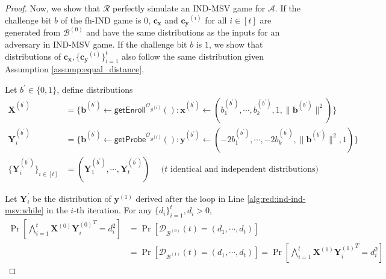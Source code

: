 \begin{proof}
Now, we show that $\mathcal{R}$ perfectly simulate an \textsf{IND-MSV} game for $\mathcal{A}$. If the challenge bit $b$ of the \textsf{fh-IND} game is $0$, $\mathbf{c_x}$ and $\mathbf{c_y}^{(i)}$ for all $i \in [t]$ are generated from $\mathcal{B}^{(0)}$ and have the same distributions as the inputs for an adversary in \textsf{IND-MSV} game.
If the challenge bit $b$ is $1$, we show that distributions of $\mathbf{c_x}, \{ \mathbf{c_y}^{(i)} \}_{i=1}^t$ also follow the same distribution given Assumption \ref{assump:equal_distance}.

Let $b^\prime \in \{0, 1\}$, define distributions 
\begin{align*}
	\mathbf{X}^{(b^\prime)} &= \{ \mathbf{b}^{(b^\prime)} \gets \textsf{getEnroll}^{\mathcal{O}_{\mathcal{B}^{(b^\prime)}}}() : \mathbf{x}^{(b^{\prime})} \gets (b_1^{(b^{\prime})}, \cdots, b_k^{(b^{\prime})}, 1, \|\mathbf{b}^{ (b^{\prime}) }\|^2) \} \\
	\mathbf{Y}^{ (b^\prime) }_i &= \{ \mathbf{b}^{(b^\prime)} \gets \textsf{getProbe}^{\mathcal{O}_{\mathcal{B}^{(b^\prime)}}}() : \mathbf{y}^{(b^{\prime})} \gets ( -2b_1^{(b^{\prime})}, \cdots, -2b_k^{(b^{\prime})}, \|\mathbf{b}^{ (b^{\prime}) }\|^2, 1) \} \\
	\{ \mathbf{Y}^{ (b^\prime) }_i \}_{ i \in [t] } &= (\mathbf{Y}^{ (b^\prime) }_1, \cdots, \mathbf{Y}^{ (b^\prime) }_t) \quad  \text{ ($t$ identical and independent distributions) }
\end{align*}

Let $\mathbf{Y}^\prime_i$ be the distribution of $\mathbf{y}^{(1)}$ derived after the loop in Line \ref{alg:red:ind-ind-msv:while} in the $i$-th iteration.
For any $\{ d_i \}_{i=1}^t, d_i > 0$,
\begin{align*}
\Pr \left[ \bigwedge_{i=1}^t \mathbf{X}^{(0)} {\mathbf{Y}^{(0)}_i}^T = d_i^2 \right] 
&= \Pr \left[ \mathcal{D}_{\mathcal{B}^{(0)}}(t) = (d_1, \cdots, d_t) \right] \\
&= \Pr \left[ \mathcal{D}_{\mathcal{B}^{(1)}}(t) = (d_1, \cdots, d_t) \right] = \Pr \left[ \bigwedge_{i=1}^t \mathbf{X}^{(1)} {\mathbf{Y}^{(1)}_i}^T = d_i^2 \right]
\end{align*}


\end{proof}
